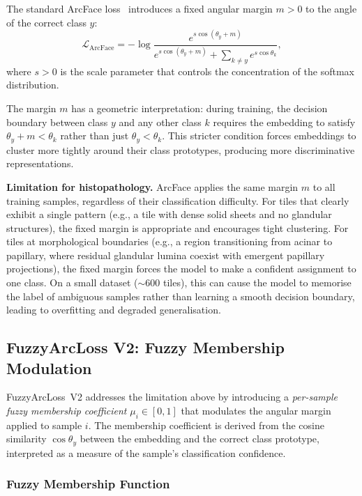 The standard ArcFace loss~\cite{deng2019arcface} introduces a fixed angular margin $m > 0$ to the angle of the correct class $y$:
\begin{equation}
\label{eq:arcface_method}
\mathcal{L}_{\text{ArcFace}} = -\log \frac{e^{s \cos(\theta_y + m)}}{e^{s \cos(\theta_y + m)} + \sum_{k \neq y} e^{s \cos\theta_k}},
\end{equation}
where $s > 0$ is the scale parameter that controls the concentration of the softmax distribution.

The margin $m$ has a geometric interpretation: during training, the decision boundary between class $y$ and any other class $k$ requires the embedding to satisfy $\theta_y + m < \theta_k$ rather than just $\theta_y < \theta_k$.
This stricter condition forces embeddings to cluster more tightly around their class prototypes, producing more discriminative representations.

\textbf{Limitation for histopathology.}
ArcFace applies the same margin $m$ to all training samples, regardless of their classification difficulty.
For tiles that clearly exhibit a single pattern (e.g., a tile with dense solid sheets and no glandular structures), the fixed margin is appropriate and encourages tight clustering.
For tiles at morphological boundaries (e.g., a region transitioning from acinar to papillary, where residual glandular lumina coexist with emergent papillary projections), the fixed margin forces the model to make a confident assignment to one class.
On a small dataset ($\sim$600 tiles), this can cause the model to memorise the label of ambiguous samples rather than learning a smooth decision boundary, leading to overfitting and degraded generalisation.

\subsection{FuzzyArcLoss V2: Fuzzy Membership Modulation}
\label{sec:meth:pattern:fuzzyv2}

FuzzyArcLoss~V2 addresses the limitation above by introducing a \emph{per-sample fuzzy membership coefficient} $\mu_i \in [0, 1]$ that modulates the angular margin applied to sample $i$.
The membership coefficient is derived from the cosine similarity $\cos\theta_y$ between the embedding and the correct class prototype, interpreted as a measure of the sample's classification confidence.

\subsubsection{Fuzzy Membership Function}
\label{sec:meth:pattern:fuzzyv2:membership}

